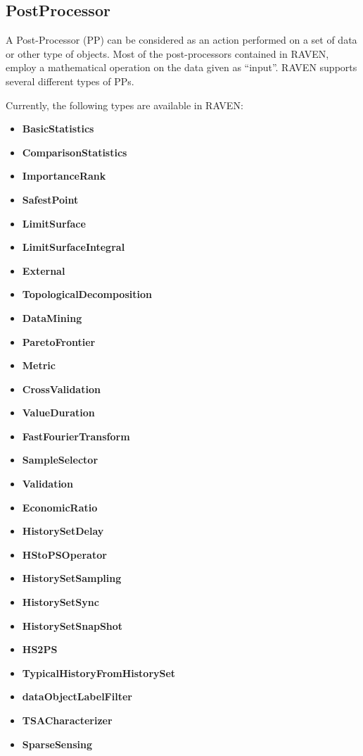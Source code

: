 \subsection{PostProcessor}
\label{sec:models_postProcessor}
A Post-Processor (PP) can be considered as an action performed on a set of data
or other type of objects.
%
Most of the post-processors contained in RAVEN, employ a mathematical operation
on the data given as ``input''.
%
RAVEN supports several different types of PPs.

Currently, the following types are available in RAVEN:
\begin{itemize}
  \itemsep0em
  \item \textbf{BasicStatistics}
  \item \textbf{ComparisonStatistics}
  \item \textbf{ImportanceRank}
  \item \textbf{SafestPoint}
  \item \textbf{LimitSurface}
  \item \textbf{LimitSurfaceIntegral}
  \item \textbf{External}
  \item \textbf{TopologicalDecomposition}
  \item \textbf{DataMining}
  \item \textbf{ParetoFrontier}
  \item \textbf{Metric}
  \item \textbf{CrossValidation}
  \item \textbf{ValueDuration}
  \item \textbf{FastFourierTransform}
  \item \textbf{SampleSelector}
  \item \textbf{Validation}
  \item \textbf{EconomicRatio}
  \item \textbf{HistorySetDelay}
  \item \textbf{HStoPSOperator}
  \item \textbf{HistorySetSampling}
  \item \textbf{HistorySetSync}
  \item \textbf{HistorySetSnapShot}
  \item \textbf{HS2PS}
  \item \textbf{TypicalHistoryFromHistorySet}
  \item \textbf{dataObjectLabelFilter}
  \item \textbf{TSACharacterizer}
  \item \textbf{SparseSensing}
\end{itemize}


